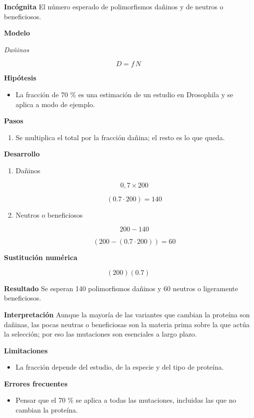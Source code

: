 \documentclass{book}
\begin{document}
\noindent\textbf{Incógnita}
El número esperado de polimorfismos dañinos y de neutros o beneficiosos.


\noindent\textbf{Modelo}

\noindent\textit{Dañinos}

\[
D = f\,N
\]

\noindent\textbf{Hipótesis}
\begin{itemize}
\item La fracción de 70 \% es una estimación de un estudio en Drosophila y se aplica a modo de ejemplo.
\end{itemize}

\noindent\textbf{Pasos}
\begin{enumerate}
\item
Se multiplica el total por la fracción dañina; el resto es lo que queda.

\end{enumerate}

\noindent\textbf{Desarrollo}
\begin{enumerate}
\item
Dañinos


\[
0,7 \times 200
\]

\[
\left(0.7\cdot 200\right) = 140
\]
\item
Neutros o beneficiosos


\[
200 - 140
\]

\[
\left(200-\left(0.7\cdot 200\right)\right) = 60
\]
\end{enumerate}

\noindent\textbf{Sustitución numérica}

\[
\left(200\right) \left(0.7\right)
\]

\noindent\textbf{Resultado}
Se esperan 140 polimorfismos dañinos y 60 neutros o ligeramente beneficiosos.


\noindent\textbf{Interpretación}
Aunque la mayoría de las variantes que cambian la proteína son dañinas, las pocas neutras o beneficiosas son la materia prima sobre la que actúa la selección; por eso las mutaciones son esenciales a largo plazo.


\noindent\textbf{Limitaciones}
\begin{itemize}
\item La fracción depende del estudio, de la especie y del tipo de proteína.
\end{itemize}

\noindent\textbf{Errores frecuentes}
\begin{itemize}
\item Pensar que el 70 \% se aplica a todas las mutaciones, incluidas las que no cambian la proteína.
\end{itemize}
\end{document}
